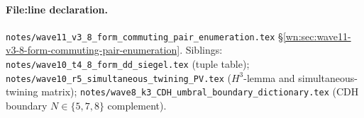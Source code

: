 \paragraph{File:line declaration.}
\texttt{notes/wave11\_v3\_8\_form\_commuting\_pair\_enumeration.tex}
\S\ref{wn:sec:wave11-v3-8-form-commuting-pair-enumeration}.
Siblings:
\texttt{notes/wave10\_t4\_8\_form\_dd\_siegel.tex} (tuple table);
\texttt{notes/wave10\_r5\_simultaneous\_twining\_PV.tex} ($H^3$-lemma
and simultaneous-twining matrix);
\texttt{notes/wave8\_k3\_CDH\_umbral\_boundary\_dictionary.tex}
(CDH boundary $N \in \{5,7,8\}$ complement).
